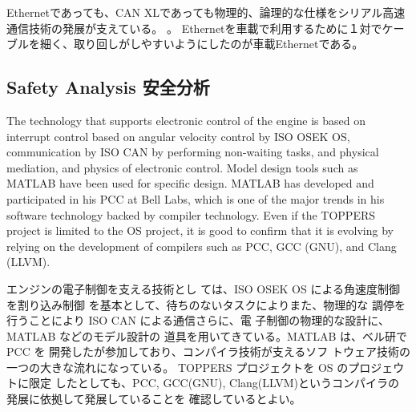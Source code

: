 \documentclass[twocolumn]{article} %
\begin{document}
Ethernetであっても、CAN XLであっても物理的、論理的な仕様をシリアル高速通信技術の発展が支えている。\cite{networki} 。
Ethernetを車載で利用するために１対でケーブルを細く、取り回しがしやすいようにしたのが車載Ethernetである。\cite{networki} 
\subsection{Safety Analysis 安全分析}
The technology that supports electronic control of the engine is based on interrupt control based on angular velocity control by ISO OSEK OS, communication by ISO CAN by performing non-waiting tasks, and physical mediation, and physics of electronic control. Model design tools such as MATLAB have been used for specific design. MATLAB has developed and participated in his PCC at Bell Labs, which is one of the major trends in his software technology backed by compiler technology.
Even if the TOPPERS project is limited to the OS project, it is good to confirm that it is evolving by relying on the development of compilers such as PCC, GCC (GNU), and Clang (LLVM).

エンジンの電子制御を支える技術とし ては、ISO OSEK OS による角速度制御を割り込み制御 を基本として、待ちのないタスクによりまた、物理的な 調停を行うことにより ISO CAN による通信さらに、電 子制御の物理的な設計に、MATLAB などのモデル設計の 道具を用いてきている。MATLAB は、ベル研で PCC を 開発したが参加しており、コンパイラ技術が支えるソフ トウェア技術の一つの大きな流れになっている。
TOPPERS プロジェクトを OS のプロジェウトに限定 したとしても、PCC, GCC(GNU), Clang(LLVM)というコンパイラの発展に依拠して発展していることを 確認しているとよい。
\end{document}
